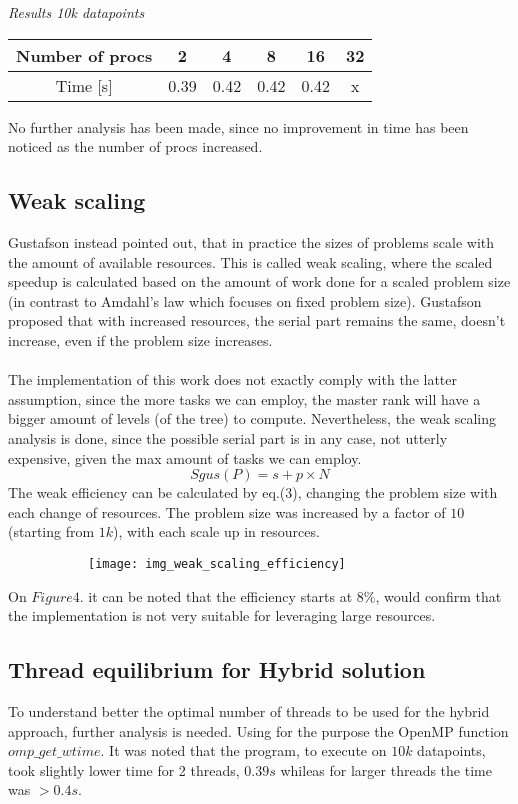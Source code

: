 \documentclass[11pt]{article}
\newcommand{\plotheight}{0.425}
\newcommand{\plotwidth}{0.7}
\begin{document}
\textit{Results 10k datapoints}
\begin{center}
\begin{tabular}{ |c|c|c|c|c|c| } 
 \hline
 Number of procs & 2 & 4 & 8 & 16 & 32 \\
 \hline
 Time [s] & 0.39 &	0.42 & 0.42	& 0.42 & x \\
 \hline
\end{tabular}
\end{center}

No further analysis has been made, since no improvement in time has been noticed as the number of procs increased.
\subsection{Weak scaling}
Gustafson instead pointed out, that in practice the sizes of problems scale with the amount of available resources.
This is called weak scaling, where the scaled speedup is calculated based on the amount of work done for a scaled problem size (in contrast to Amdahl’s law which focuses on fixed problem size). Gustafson proposed that with increased resources, the serial part remains the same, doesn't increase, even if the problem size increases.\\\\The implementation of this work does not exactly comply with the latter assumption, since the more tasks we can employ, the master rank will have a bigger amount of levels (of the tree) to compute. Nevertheless, the weak scaling analysis is done, since the possible serial part is in any case, not utterly expensive, given the max amount of tasks we can employ.
\begin{equation} \label{eqn}
	Sgus(P) = {s + p × N} 
\end{equation}
The weak efficiency can be calculated by eq.(3), changing the problem size with each change of resources.  The problem size was increased by a factor of $10$ (starting from $1k$), with each scale up in resources.
\begin{figure}[H]
\centering
\begin{subfigure}{\plotwidth\textwidth}
\centering
\texttt{[image: img\_weak\_scaling\_efficiency]}
\end{subfigure}
\end{figure}
On $Figure 4.$ it can be noted that the efficiency starts at $8\%$, would confirm that the implementation is not very suitable for leveraging large resources.
\subsection{Thread equilibrium for Hybrid solution}
To understand better the optimal number of threads to be used for the hybrid approach, further analysis is needed.
Using for the purpose the OpenMP function $omp\_get\_wtime$.
It was noted that the program, to execute on $10k$ datapoints, took slightly lower time for 2 threads, $0.39s$ whileas for larger threads the time was $>0.4s$.
\end{document}
